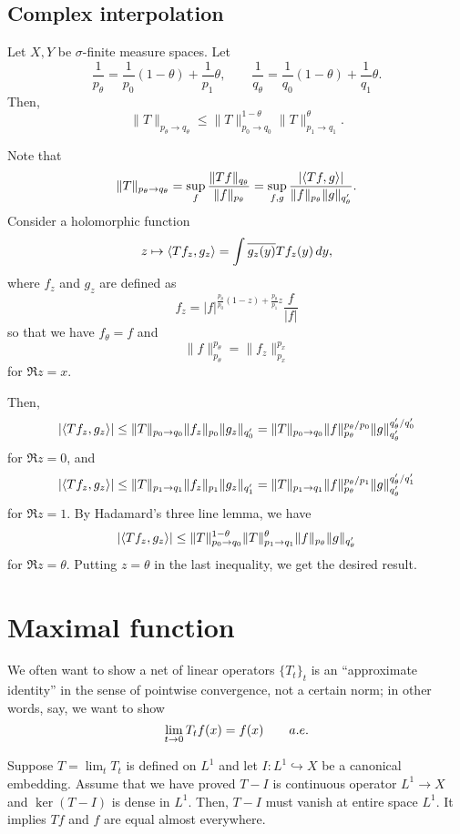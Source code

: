 \documentclass{../crs}
\begin{document}
\subsection{Complex interpolation}
\begin{thm}
Let $X,Y$ be $\sigma$-finite measure spaces.
Let
\[\frac1{p_\theta}=\frac1{p_0}(1-\theta)+\frac1{p_1}\theta,\qquad\frac1{q_\theta}=\frac1{q_0}(1-\theta)+\frac1{q_1}\theta.\]
Then,
\[\|T\|_{p_\theta\to q_\theta}\le\|T\|_{p_0\to q_0}^{1-\theta}\|T\|_{p_1\to q_1}^\theta.\]
\end{thm}
\begin{pf}
Note that
\[\|T\|_{p_\theta\to q_\theta}=\sup_f\frac{\|Tf\|_{q_\theta}}{\|f\|_{p_\theta}}=\sup_{f,g}\frac{\abs{\inn{Tf}{g}}}{\|f\|_{p_\theta}\|g\|_{q'_\theta}}.\]
Consider a holomorphic function
\[z\mapsto\left\langle Tf_z,g_z\right\rangle=\int\overline{g_z(y)}Tf_z(y)\,dy,\]
where $f_z$ and $g_z$ are defined as
\[f_z=|f|^{\frac{p_\theta}{p_0}(1-z)+\frac{p_\theta}{p_1}z}\frac f{|f|}\]
so that we have $f_\theta=f$ and
\[\|f\|_{p_\theta}^{p_\theta}=\|f_z\|_{p_x}^{p_x}\]
for $\Re z=x$.

Then,
\[\abs{\inn{Tf_z}{g_z}}\le\|T\|_{p_0\to q_0}\|f_z\|_{p_0}\|g_z\|_{q'_0}=\|T\|_{p_0\to q_0}\|f\|_{p_\theta}^{p_\theta/p_0}\|g\|_{q'_\theta}^{q'_\theta/q'_0}\]
for $\Re z=0$, and
\[\abs{\inn{Tf_z}{g_z}}\le\|T\|_{p_1\to q_1}\|f_z\|_{p_1}\|g_z\|_{q'_1}=\|T\|_{p_1\to q_1}\|f\|_{p_\theta}^{p_\theta/p_1}\|g\|_{q'_\theta}^{q'_\theta/q'_1}\]
for $\Re z=1$.
By Hadamard's three line lemma, we have
\[\abs{\inn{Tf_z}{g_z}}\le\|T\|_{p_0\to q_0}^{1-\theta}\|T\|_{p_1\to q_1}^\theta\|f\|_{p_\theta}\|g\|_{q'_\theta}\]
for $\Re z=\theta$.
Putting $z=\theta$ in the last inequality, we get the desired result.
\end{pf}









\section{Maximal function}

We often want to show a net of linear operators $\{T_t\}_t$ is an ``approximate identity'' in the sense of pointwise convergence, not a certain norm; in other words, say, we want to show
\[\lim_{t\to0}T_tf(x)=f(x)\for a.e.\]

Suppose $T=\lim_tT_t$ is defined on $L^1$ and let $I:L^1\hookrightarrow X$ be a canonical embedding.
Assume that we have proved $T-I$ is continuous operator $L^1\to X$ and $\ker(T-I)$ is dense in $L^1$.
Then, $T-I$ must vanish at entire space $L^1$.
It implies $Tf$ and $f$ are equal almost everywhere.
\end{document}
